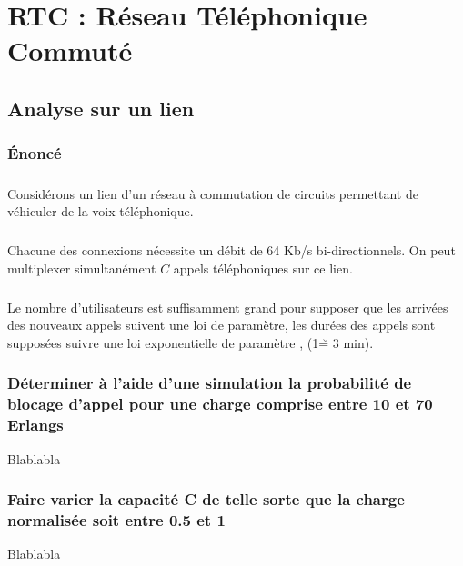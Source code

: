 %
\chapter{RTC : Réseau Téléphonique Commuté}
%
    \section{Analyse sur un lien}
%
        \subsection{Énoncé}
%
            \paragraph{}
Considérons un lien d'un réseau à commutation de circuits permettant de véhiculer de la voix téléphonique.
%
            \paragraph{}
Chacune des connexions nécessite un débit de 64 Kb/s bi-directionnels.
On peut multiplexer simultanément $C$ appels téléphoniques sur ce lien.
%
        \paragraph{}
        Le nombre d'utilisateurs est suffisamment grand pour supposer que les arrivées des nouveaux appels suivent une loi de paramètre, les durées des appels sont supposées suivre une loi exponentielle de paramètre , (1\u = 3 min).
%
        \subsection{Déterminer à l'aide d'une simulation la probabilité de blocage d'appel pour une charge comprise entre 10 et 70 Erlangs}
Blablabla
%
        \subsection{Faire varier la capacité C de telle sorte que la charge normalisée soit entre 0.5 et 1}
Blablabla
%
